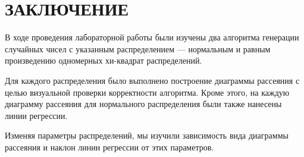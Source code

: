 \section*{ЗАКЛЮЧЕНИЕ}

В ходе проведения лабораторной работы были изучены два алгоритма
генерации случайных чисел с указанным распределением --- нормальным и равным произведению 
одномерных хи-квадрат распределений.

Для каждого распределения было выполнено построение диаграммы рассеяния 
с целью визуальной проверки корректности алгоритма. 
Кроме этого, на каждую диаграмму рассеяния для нормального распределения 
были также нанесены линии регрессии.

Изменяя параметры распределений, мы изучили зависимость вида диаграммы рассеяния и
наклон линии регрессии от этих параметров.

\newpage
